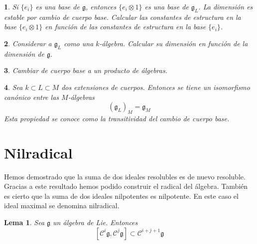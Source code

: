 \documentclass[a4paper,draft,12pt]{scrartcl}
\newtheorem{lema}[teo]{Lema}%
\newtheorem{pro1}{}%
\newenvironment{pro}{\begin{pro1} \rm} {\end{pro1}}
\newcommand{\central}{\mathcal{C}}%
\newcommand{\df}[1]{\textsf{\color{blue}#1}}
\begin{document}
\begin{pro}

Si $\{e_i\}$ es una base de $\mathfrak{g}$, entonces $\{e_i \otimes 1\}$ es una base de $\mathfrak{g}_L$. La dimensión es estable por cambio de cuerpo base.  Calcular las constantes de estructura en la base $\{e_i \otimes 1\}$ en función de las constantes de estructura en la base $\{e_i\}$.

\end{pro}

\begin{pro}

Considerar a $\mathfrak{g}_L$ como una $k$-álgebra.  Calcular su dimensión en función de la dimensión de $\mathfrak{g}$.

\end{pro}

\begin{pro}

Cambiar de cuerpo base a un producto de álgebras.

\end{pro}

\begin{pro}

Sea $k \subset L \subset M$ dos extensiones de cuerpos. Entonces se tiene un isomorfismo canónico entre las $M$-álgebras
$$
(\mathfrak{g}_L)_M = \mathfrak{g}_M
$$
Esta propiedad se conoce como la  \df{transitividad} del cambio de cuerpo base.

\end{pro}

\newpage

\section{Nilradical}

Hemos demostrado que la suma de dos ideales resolubles es de nuevo resoluble.  Gracias a este resultado hemos podido construir el radical del álgebra.  También es cierto que la suma de dos ideales nilpotentes es nilpotente.  En este caso el ideal maximal se denomina   \df{nilradical}.

\begin{lema}

Sea $\mathfrak{g}$ un álgebra de Lie.  Entonces
$$
[\central^i\mathfrak{g}, \central^j \mathfrak{g}]\subset \central^{i+j+1}\mathfrak{g}
$$

\end{lema}
\end{document}
